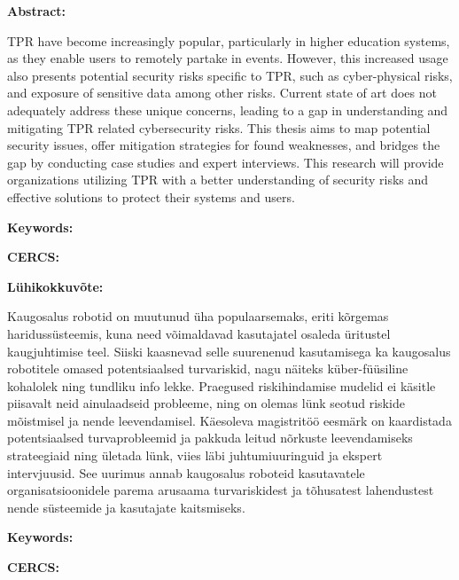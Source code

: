
\newpage
\noindent\textbf{\large {\sentencecase{\thesisTitle}}}

\vspace*{3ex}

\noindent\textbf{Abstract:}
\vspace{-1ex}

\ac{TPR} have become increasingly popular, particularly
in higher education systems, as they enable users to remotely partake in
events. However, this increased usage also presents potential security risks
specific to \ac{TPR}, such as cyber-physical risks, and exposure of sensitive data among other risks. Current state of art does not
adequately
address these unique concerns, leading to a gap in understanding and
mitigating \ac{TPR} related cybersecurity risks.
This thesis aims to map potential security issues, offer mitigation strategies for found weaknesses, and bridges the gap by
conducting case
studies and expert interviews.
This research will provide organizations utilizing \ac{TPR} with a
better understanding of security risks and effective solutions to protect
their systems and users.

\vspace*{1ex}

\noindent\textbf{Keywords:}
\vspace{-1ex}
{\thesisKeywordsEng}
\vspace*{1ex}

\noindent\textbf{CERCS:}
\vspace{-1ex}
{\thesisCERCSEng}
\vspace*{3ex}

\noindent\textbf{\large {\thesisTitleEst}}
\vspace*{1ex}

\noindent\textbf{Lühikokkuvõte:}
\vspace{-1ex}

Kaugosalus robotid on muutunud üha populaarsemaks, eriti kõrgemas haridussüsteemis, kuna need võimaldavad kasutajatel osaleda üritustel
kaugjuhtimise teel. Siiski kaasnevad selle suurenenud kasutamisega ka kaugosalus robotitele omased potentsiaalsed turvariskid, nagu näiteks
küber-füüsiline kohalolek ning tundliku info lekke. Praegused riskihindamise mudelid ei käsitle
piisavalt neid ainulaadseid probleeme, ning on olemas lünk seotud riskide mõistmisel ja nende leevendamisel.
Käesoleva magistritöö eesmärk on kaardistada potentsiaalsed turvaprobleemid ja pakkuda leitud nõrkuste leevendamiseks strateegiaid ning
ületada lünk, viies läbi juhtumiuuringuid ja ekspert intervjuusid. See uurimus annab kaugosalus roboteid kasutavatele organisatsioonidele
parema arusaama turvariskidest ja tõhusatest lahendustest nende süsteemide ja kasutajate kaitsmiseks.
\vspace*{1ex}

\noindent\textbf{Keywords:}
\vspace{-1ex}
{\thesisKeywordsEst}
\vspace*{1ex}

\noindent\textbf{CERCS:}
\vspace{-1ex}
{\thesisCERCSEst}

